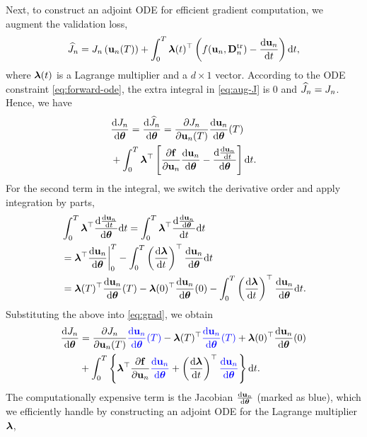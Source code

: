 Next, to construct an adjoint ODE for efficient gradient computation, we augment the validation loss,
\begin{align}
	{\widehat{J}}_n = J_n\left({\bf u}_n(T)\right) + \int_0^T \boldsymbol{\lambda}(t)^\top \left(f({\bf u}_n, {\bf D}_n^{\text{tr}}) - \frac{{\rm d} {\bf u}_n}{{\rm d} t}\right) {\rm d} t,  \label{eq:aug-J}
\end{align}
where $\boldsymbol{\lambda}(t)$ is a Lagrange multiplier and a $d \times 1$ vector. According to the ODE constraint \eqref{eq:forward-ode},  the extra integral in \eqref{eq:aug-J} is $0$ and ${\widehat{J}}_n = J_n$. Hence, we have 
\begin{align}
	&\frac{{\rm d} J_n}{{\rm d} \boldsymbol{\theta}} = \frac{{\rm d} {\widehat{J}}_n}{{\rm d} \boldsymbol{\theta}} = \frac{\partial J_n}{\partial {\bf u}_n(T)} \frac{{\rm d} {\bf u}_n}{{\rm d} \boldsymbol{\theta}}(T) \notag \\
	&+ \int_0^T \boldsymbol{\lambda}^\top \left[\frac{\partial {\bf f}}{\partial {\bf u}_n} \frac{{\rm d} {\bf u}_n}{{\rm d} \boldsymbol{\theta}} - \frac{{\rm d} \frac{{\rm d} {\bf u}_n}{{\rm d} t}}{{\rm d} \boldsymbol{\theta}}\right] {\rm d} t.  \label{eq:grad}
\end{align}
For the second term in the integral, we switch the derivative order and apply integration by parts, 
	\begin{align}
		&\int_0^T \boldsymbol{\lambda}^\top  \frac{{\rm d} \frac{{\rm d} {\bf u}_n}{{\rm d} t}}{{\rm d} \boldsymbol{\theta}} {\rm d} t = \int_0^T \boldsymbol{\lambda}^\top  \frac{{\rm d} \frac{{\rm d} {\bf u}_n}{{\rm d} \boldsymbol{\theta}}}{{\rm d} t} {\rm d} t \notag \\
		&= \boldsymbol{\lambda}^\top \frac{{\rm d} {\bf u}_n}{{\rm d} \boldsymbol{\theta}}\bigg|_0^T - \int_0^T \left(\frac{{\rm d} \boldsymbol{\lambda}}{{\rm d} t}\right)^\top \frac{{\rm d} {\bf u}_n}{{\rm d} \boldsymbol{\theta}} {\rm d} t \notag \\
		&= \boldsymbol{\lambda}(T)^\top \frac{{\rm d} {\bf u}_n}{{\rm d} \boldsymbol{\theta}}(T) - \boldsymbol{\lambda}(0)^\top \frac{{\rm d} {\bf u}_n}{{\rm d} \boldsymbol{\theta}}(0) - \int_0^T \left(\frac{{\rm d} \boldsymbol{\lambda}}{{\rm d} t}\right)^\top \frac{{\rm d} {\bf u}_n}{{\rm d} \boldsymbol{\theta}} {\rm d} t. \notag 
	\end{align}
Substituting the above into \eqref{eq:grad}, we obtain  
\begin{align}
	\frac{\d J_n}{\d \btheta}  &= \frac{\partial J_n}{\partial \u_n(T)} \textcolor{blue}{\frac{\d \u_n}{\d \btheta}(T)} - \blambda(T)^\top \textcolor{blue}{\frac{\d \u_n}{\d \btheta}(T)} + \blambda(0)^\top \frac{\d \u_n}{\d \btheta}(0) \notag \\
	&+ \int_0^T\left\{ \blambda^\top \frac{\partial \f}{\partial \u_n}\textcolor{blue}{\frac{\d \u_n}{\d \btheta}} + \left(\frac{\d \blambda}{\d t}\right)^\top \textcolor{blue}{\frac{\d \u_n}{\d \btheta}}\right\}\d t. \notag %
\end{align}
The computationally expensive term is the Jacobian $\frac{{\rm d} {\bf u}_n}{{\rm d} \boldsymbol{\theta}}$ (marked as blue), which we efficiently handle by constructing an adjoint ODE for the Lagrange multiplier $\boldsymbol{\lambda}$,   
